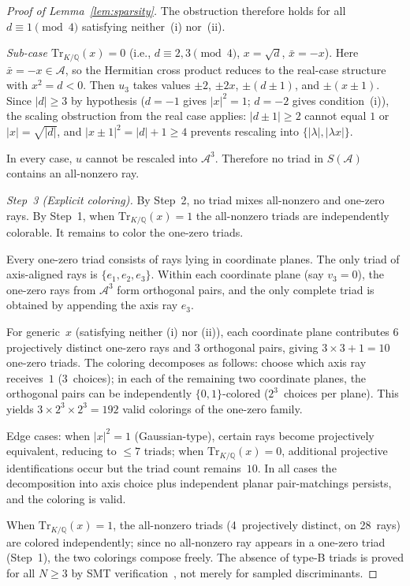 \documentclass[12pt,a4paper]{article}
\newcommand{\Q}{\mathbb{Q}}
\newcommand{\Tr}[1]{\mathrm{Tr}_{K/\Q}\!\left(#1\right)}
\begin{document}
\begin{proof}[Proof of Lemma~\ref{lem:sparsity}]
The obstruction therefore holds for all $d \equiv 1 \pmod{4}$
satisfying neither~(i) nor~(ii).

\emph{Sub-case $\Tr{x} = 0$} (i.e., $d \equiv 2, 3 \pmod{4}$,
$x = \sqrt{d}$, $\bar{x} = -x$).
Here $\bar{x} = -x \in \mathcal{A}$, so the Hermitian cross product
reduces to the real-case structure with $x^2 = d < 0$.  Then $u_3$
takes values $\pm 2$, $\pm 2x$, $\pm(d \pm 1)$, and $\pm(x \pm 1)$.
Since $|d| \geq 3$ by hypothesis ($d = -1$ gives $|x|^2 = 1$;
$d = -2$ gives condition~(i)), the scaling obstruction from the real
case applies: $|d \pm 1| \geq 2$ cannot equal $1$ or $|x| =
\sqrt{|d|}$, and $|x \pm 1|^2 = |d| + 1 \geq 4$ prevents rescaling
into $\{|\lambda|, |\lambda x|\}$.

In every case, $u$ cannot be rescaled into $\mathcal{A}^3$.  Therefore
no triad in $S(\mathcal{A})$ contains an all-nonzero ray.

\medskip
\noindent\textit{Step~3 (Explicit coloring).}
By Step~2, no triad mixes all-nonzero and one-zero rays.
By Step~1, when $\Tr{x} = 1$ the all-nonzero triads are independently
colorable.  It remains to color the one-zero triads.

Every one-zero triad consists of rays lying in coordinate
planes.  The only triad of axis-aligned rays is
$\{e_1, e_2, e_3\}$.  Within each coordinate plane (say $v_3 = 0$),
the one-zero rays from $\mathcal{A}^3$ form orthogonal pairs, and the
only complete triad is obtained by appending the axis ray $e_3$.

For generic~$x$ (satisfying neither (i) nor (ii)), each coordinate
plane contributes 6 projectively distinct one-zero rays and 3
orthogonal pairs, giving $3 \times 3 + 1 = 10$ one-zero triads.  The
coloring decomposes as follows: choose which axis ray receives~$1$
(3~choices); in each of the remaining two coordinate planes, the
orthogonal pairs can be independently $\{0,1\}$-colored
($2^3$~choices per plane).  This yields $3 \times 2^3 \times 2^3 =
192$ valid colorings of the one-zero family.

Edge cases: when $|x|^2 = 1$ (Gaussian-type), certain rays become
projectively equivalent, reducing to $\leq 7$ triads; when $\Tr{x} =
0$, additional projective identifications occur but the triad count
remains~$10$.  In all cases the decomposition into axis choice plus
independent planar pair-matchings persists, and the coloring is valid.

When $\Tr{x} = 1$, the all-nonzero triads (4~projectively distinct,
on 28~rays) are colored independently; since no all-nonzero ray
appears in a one-zero triad (Step~1), the two colorings compose
freely.  The absence of type-B triads is proved for all $N \geq 3$
by SMT verification~\cite{deMouraBjorner2008}, not merely for
sampled discriminants.
\end{proof}
\end{document}
